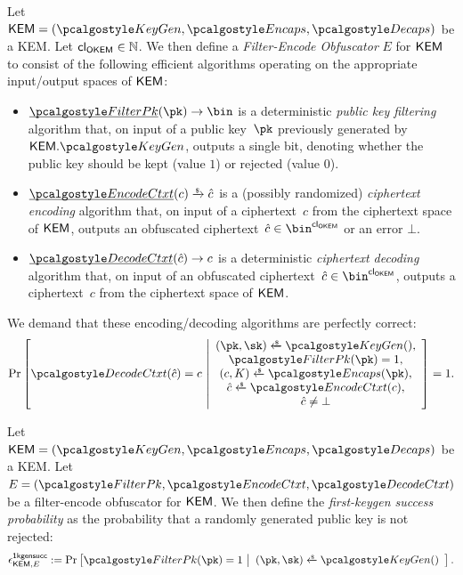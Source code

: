 \begin{definition}
\label{def:filter-encode-obfs}
    Let $\KEM = (\kgen, \encaps, \decaps)$ be a KEM.
    Let ${\mathsf{cl}_{\mathsf{OKEM}}} \in \mathbb N$.
    We then define a \emph{Filter-Encode Obfuscator} $E$ for $\mathsf{KEM}$ to consist of the following efficient algorithms operating on the appropriate input/output spaces of $\mathsf{KEM}$:
    \begin{itemize}
        \item $\ul{\filterpk}(\pk) \to \bin$
        is a deterministic \emph{public key filtering} algorithm that, on input of a public key~$\pk$ previously generated by $\KEM.\kgen$, outputs a single bit, denoting whether the public key should be kept (value $1$) or rejected (value $0$).
        \item $\ul{\encodectxt}(c) \tor \hat c$
        is a (possibly randomized) \emph{ciphertext encoding} algorithm that, on input of a ciphertext~$c$ from the ciphertext space of $\mathsf{KEM}$, outputs an obfuscated ciphertext~$\hat c \in \bin^{\obfctxtlen}$ or an error $\bot$.
        \item $\ul{\decodectxt}(\hat c) \to c$
        is a deterministic \emph{ciphertext decoding} algorithm that, on input of an obfuscated ciphertext~$\hat c \in \bin^{\obfctxtlen}$, outputs a ciphertext~$c$ from the ciphertext space of $\mathsf{KEM}$.
    \end{itemize}

    We demand that these encoding/decoding algorithms are perfectly correct:
    \[
        \Pr\left[
            \decodectxt(\hat c) = c
        ~\middle|
            \begin{array}{c}
                (\pk, \sk) \getsr \kgen(),\\
                \filterpk(\pk) = 1, \\
                (c, K) \getsr \encaps(\pk),\\
                \hat c \getsr \encodectxt(c),\\
                \hat c \neq \bot
            \end{array}
        \right] = 1.
    \]
\end{definition}

\begin{definition}
\label{def:first-keygen-success}
    Let $\KEM = (\kgen, \encaps, \decaps)$ be a KEM.
    Let $E = (\filterpk, \encodectxt, \decodectxt)$ be a filter-encode obfuscator for $\mathsf{KEM}$.
    We then define the \emph{first-keygen success probability} as the probability that a randomly generated public key is not rejected:
    \[
        \epsilon^\firstkeygensuccess_{\KEM,E} :=
        \Pr\left[
            \filterpk(\pk) = 1
        ~\middle|
            \begin{array}{c}
                (\pk, \sk) \getsr \kgen()
            \end{array}
        \right].
    \]
\end{definition}

